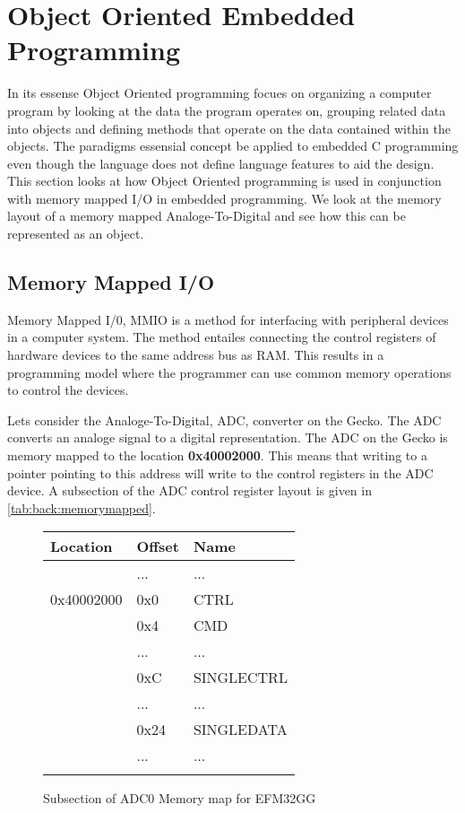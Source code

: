 \section{Object Oriented Embedded Programming}
\label{sec:back:oo}

In its essense Object Oriented programming focues on organizing a computer program by looking at the data the program operates on, grouping related data into objects and defining methods that operate on the data contained within the objects.
The paradigms essensial concept be applied to embedded C programming even though the language does not define language features to aid the design.
This section looks at how Object Oriented programming is used in conjunction with memory mapped I/O in embedded programming.
We look at the memory layout of a memory mapped Analoge-To-Digital and see how this can be represented as an object.

\subsection{Memory Mapped I/O}
Memory Mapped I/0, MMIO is a method for interfacing with peripheral devices in a computer system.
The method entailes connecting the control registers of hardware devices to the same address bus as RAM.
This results in a programming model where the programmer can use common memory operations to control the devices.

Lets consider the Analoge-To-Digital, ADC, converter on the Gecko.
The ADC converts an analoge signal to a digital representation.
The ADC on the Gecko is memory mapped to the location \textbf{0x40002000}.
This means that writing to a pointer pointing to this address will write to the control registers in the ADC device.
A subsection of the ADC control register layout is given in \autoref{tab:back:memorymapped}.
\begin{figure}[H]
  \centering
  \begin{tabular}{l|l|l|}
    Location&Offset&Name\\
    \hline
    &...&...\\
    \hline
    \hline
    0x40002000&0x0&CTRL\\
    \hline
    &0x4&CMD\\
    \hline
    &...&...\\
    \hline
    &0xC&SINGLECTRL\\
    \hline
    &...&...\\
    \hline
    &0x24&SINGLEDATA\\
    \hline
    &...&...\\
    \hline
    \hline
    &&\\
  \end{tabular}
  \caption{Subsection of ADC0 Memory map for EFM32GG}
  \label{tab:back:memorymapped}
\end{figure}

